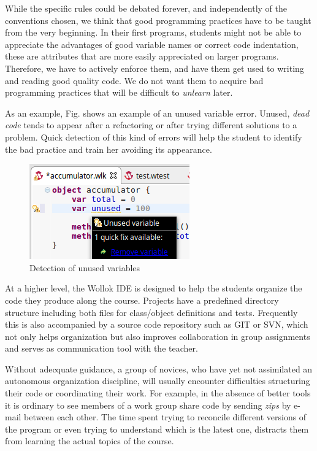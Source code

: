 While the specific rules could be debated forever, and independently of the conventions chosen,
we think that good programming practices have to be taught from the very beginning.
In their first programs, students might not be able to appreciate the advantages of good variable names or correct code indentation, these are attributes that are more easily appreciated on larger programs.
Therefore, we have to actively enforce them, and have them get used to writing and reading good quality code.
We do not want them to acquire bad programming practices that will be difficult to \emph{unlearn} later.

As an example, Fig.  shows an example of an unused variable error.
Unused, \emph{dead code} tends to appear after a refactoring or after trying different solutions to a problem. 
Quick detection of this kind of errors will help the student to identify the bad practice and train her avoiding its appearance.

\begin{figure}[ht]
    \centering
	\includegraphics[scale=0.5]{images/wollok-paper-check-unusedVariable.png}
    \caption{Detection of unused variables}
    \label{fig:check-unusedVariable}
\end{figure}

\medskip
At a higher level, the Wollok IDE is designed to help the students organize the code they produce along the course. 
Projects have a predefined directory structure including both files for class/object definitions and tests.
Frequently this is also accompanied by a source code repository such as GIT or SVN,
which not only helps organization but also improves collaboration in group assignments
and serves as communication tool with the teacher.

Without adecquate guidance, a group of novices, who have yet not assimilated an autonomous organization discipline, will usually encounter difficulties structuring their code or coordinating their work.
For example, in the absence of better tools it is ordinary to see members of a work group share code by sending \emph{zips} by e-mail between each other.
The time spent trying to reconcile different versions of the program or even trying to understand which is the latest one, distracts them from learning the actual topics of the course.


